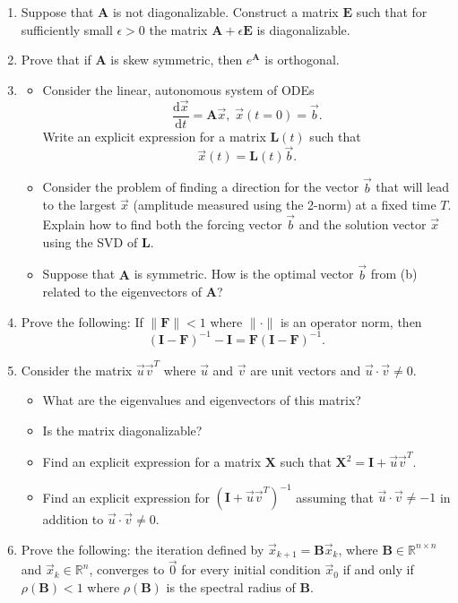 \documentclass[11pt,fleqn]{article}
\newcommand{\mat}[1]{\mathbf{#1}}
\begin{document}
\begin{enumerate}
\item Suppose that $\mathbf{A}$ is not diagonalizable. Construct a matrix $\mathbf{E}$ such that for sufficiently small $\epsilon>0$ the matrix $\mathbf{A} + \epsilon\mathbf{E}$ is diagonalizable.
\item Prove that if $\mat{A}$ is skew symmetric, then $e^{\mat{A}}$ is orthogonal.
\item 
\begin{itemize}
	\item[(a)] Consider the linear, autonomous system of ODEs
\[\frac{\mathrm{d}\vec{x}}{\mathrm{d}t} = \mathbf{A}\vec{x},\;\vec{x}(t=0) = \vec{b}.\] 
	Write an explicit expression for a matrix $\mathbf{L}(t)$ such that
\[\vec{x}(t) = \mathbf{L}(t)\vec{b}.\]
	\item[(b)] Consider the problem of finding a direction for the vector $\vec{b}$ that will lead to the largest $\vec{x}$ (amplitude measured using the 2-norm) at a fixed time $T$. Explain how to find both the forcing vector $\vec{b}$ and the solution vector $\vec{x}$ using the SVD of $\mathbf{L}$.
	\item[(c)] Suppose that $\mathbf{A}$ is symmetric. How is the optimal vector $\vec{b}$ from (b) related to the eigenvectors of $\mathbf{A}$?
\end{itemize}
\item Prove the following: If $\|\mat{F}\|<1$ where $\|\cdot\|$ is an operator norm, then 
\[(\mat{I}-\mat{F})^{-1} - \mat{I} = \mat{F}(\mat{I}-\mat{F})^{-1}.\]
\item Consider the matrix $\vec{u}\vec{v}^T$ where $\vec{u}$ and $\vec{v}$ are unit vectors and $\vec{u}\cdot\vec{v}\neq0$.
	\begin{itemize}
	\item[(a)] What are the eigenvalues and eigenvectors of this matrix?
	\item[(b)] Is the matrix diagonalizable?
	\item[(c)] Find an explicit expression for a matrix $\mathbf{X}$ such that $\mathbf{X}^2 = \mathbf{I} + \vec{u}\vec{v}^T$.
	\item[(d)] Find an explicit expression for $(\mathbf{I} + \vec{u}\vec{v}^T)^{-1}$ assuming that $\vec{u}\cdot\vec{v}\neq -1$ in addition to $\vec{u}\cdot\vec{v}\neq 0$.
	\end{itemize}

\item Prove the following: the iteration defined by $\vec{x}_{k+1}=\mat{B}\vec{x}_k$, where $\mat{B}\in\mathbb{R}^{n\times n}$ and $\vec{x}_k\in\mathbb{R}^n$,  converges to $\vec{0}$ for every initial condition $\vec{x}_0$ if and only if $\rho(\mat{B})<1$ where $\rho(\mat{B})$ is the spectral radius of $\mat{B}$.
\end{enumerate}
 
\end{document}
